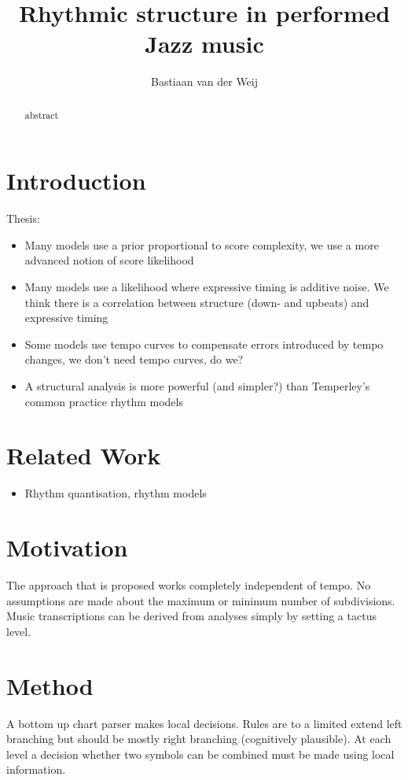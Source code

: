 \documentclass[a4paper,10pt]{article}
\title{Rhythmic structure in performed Jazz music}
\author{Bastiaan van der Weij}
\begin{document}
\maketitle
\begin{abstract}
abstract
\end{abstract}
\section{Introduction}
\label{sec:introduction}
Thesis:
\begin{itemize}
\item Many models use a prior proportional to score complexity, we use a more advanced notion of score likelihood
\item Many models use a likelihood where expressive timing is additive noise. We think there is a correlation between structure (down- and upbeats) and expressive timing
\item Some models use tempo curves to compensate errors introduced by tempo changes, we don't need tempo curves, do we?
\item A structural analysis is more powerful (and simpler?) than Temperley's common practice rhythm models
\end{itemize}
\section{Related Work}
\label{sec:relatedwork}

\begin{itemize}
\item Rhythm quantisation, rhythm models
\end{itemize}

\section{Motivation}
\label{sec:motivation}


The approach that is proposed works completely independent of tempo. No assumptions are made about the maximum or minimum number of subdivisions. Music transcriptions can be derived from analyses simply by setting a tactus level.

\section{Method}
\label{sec:method}

A bottom up chart parser makes local decisions. Rules are to a limited extend left branching but should be mostly right branching (cognitively plausible). At each level a decision whether two symbols can be combined must be made using local information.
\end{document}
